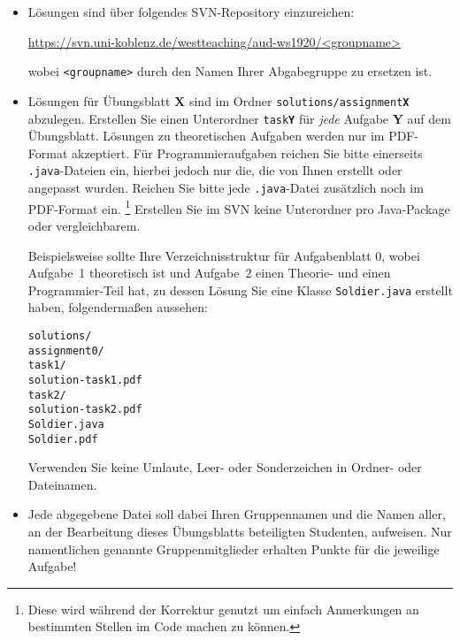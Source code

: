 \documentclass[german]{acAssignment}
\begin{document}
\begin{itemize}
    \item Lösungen sind über folgendes SVN-Repository einzureichen:
    
        \url{https://svn.uni-koblenz.de/westteaching/aud-ws1920/<groupname>}
        
        wobei \texttt{<groupname>} durch den Namen Ihrer Abgabegruppe zu ersetzen ist.
    
    \item Lösungen für Übungsblatt \textbf{X} sind im Ordner \texttt{solutions/assignment\textbf{X}} abzulegen.
        Erstellen Sie einen Unterordner \texttt{task\textbf{Y}} für \emph{jede} Aufgabe \textbf{Y} auf dem Übungsblatt.
        Lösungen zu theoretischen Aufgaben werden nur im PDF-Format akzeptiert.
        Für Programmieraufgaben reichen Sie bitte einerseits \texttt{.java}-Dateien ein, hierbei jedoch nur die, die von Ihnen erstellt oder angepasst wurden.
        Reichen Sie bitte jede \texttt{.java}-Datei zusätzlich noch im PDF-Format ein.%
        \footnote{Diese wird während der Korrektur genutzt um einfach Anmerkungen an bestimmten Stellen im Code machen zu können.}
        Erstellen Sie im SVN keine Unterordner pro Java-Package oder vergleichbarem.
        
        Beispielsweise sollte Ihre Verzeichnisstruktur für Aufgabenblatt 0, wobei Aufgabe~1 theoretisch ist und Aufgabe~2 einen Theorie- und einen Programmier-Teil hat, zu dessen Lösung Sie eine Klasse \texttt{Soldier.java} erstellt haben, folgendermaßen aussehen:
        
        \texttt{solutions/\\
        \phantom{xx}assignment0/\\
        \phantom{xxxx}task1/\\
        \phantom{xxxxxx}solution-task1.pdf\\
        \phantom{xxxx}task2/\\
        \phantom{xxxxxx}solution-task2.pdf\\
        \phantom{xxxxxx}Soldier.java\\
        \phantom{xxxxxx}Soldier.pdf}
        
        Verwenden Sie keine Umlaute, Leer- oder Sonderzeichen in Ordner- oder Dateinamen.
    
    \item Jede abgegebene Datei soll dabei Ihren Gruppennamen und die Namen aller, an der Bearbeitung dieses Übungsblatts beteiligten Studenten, aufweisen.
        Nur namentlichen genannte Gruppenmitglieder erhalten Punkte für die jeweilige Aufgabe!
    

\end{itemize}
\end{document}
